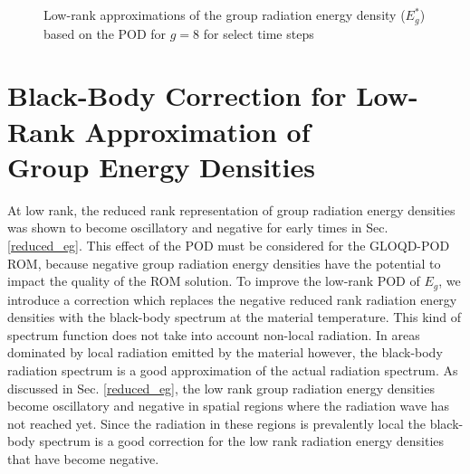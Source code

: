 	\begin{figure}[ht!]
		\centering
		\\
		\\
		\caption{\label{fig:Eg_g8_recomps}
			Low-rank approximations of the group radiation energy density ($E_g^*$) based on the POD for $g=8$ for select time steps}
	\end{figure}

\section[Black-Body Correction for Low-Rank Approximation of Group Energy Densities]{Black-Body Correction for Low-Rank Approximation of \\ Group Energy Densities} \label{bb_cor}
	\ind At low rank, the reduced rank representation of group radiation energy densities was shown to become oscillatory and negative for early times in Sec. \ref{reduced_eg}. This effect of the POD must be considered for the GLOQD-POD ROM, because negative group radiation energy densities have the potential to impact the quality of the ROM solution. To improve the low-rank POD of $E_g$, we introduce a correction which replaces the negative reduced rank radiation energy densities with the black-body spectrum at the material temperature. This kind of spectrum  function does not take into account non-local radiation. In areas dominated by local radiation emitted by the material however, the black-body radiation spectrum is a good approximation of the actual radiation spectrum. As discussed in Sec. \ref{reduced_eg}, the low rank group radiation energy densities become oscillatory and negative in spatial regions where the radiation wave has not reached yet. Since the radiation in these regions is prevalently local the black-body spectrum is a good correction for the low rank radiation energy densities that have become negative.
	
